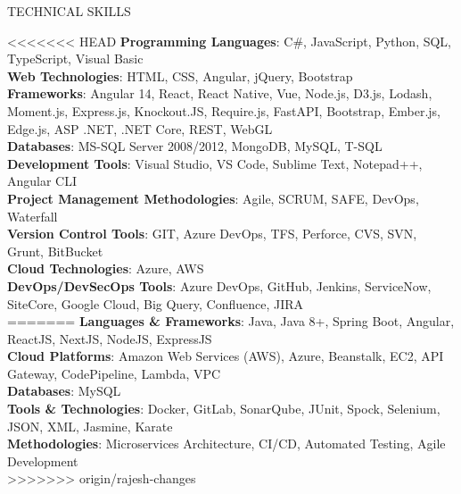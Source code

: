 \documentclass{resume} %
\begin{document}
\begin{rSection}{TECHNICAL SKILLS}
    \begin{flushleft}
<<<<<<< HEAD
                    \textbf{Programming Languages}: C\#, JavaScript, Python, SQL, TypeScript, Visual Basic \\
                    \textbf{Web Technologies}: HTML, CSS, Angular, jQuery, Bootstrap \\
                    \textbf{Frameworks}: Angular 14, React, React Native, Vue, Node.js, D3.js, Lodash, Moment.js, Express.js, Knockout.JS, Require.js, FastAPI, Bootstrap, Ember.js, Edge.js, ASP .NET, .NET Core, REST, WebGL \\
                    \textbf{Databases}: MS{-}SQL Server 2008/2012, MongoDB, MySQL, T{-}SQL \\
                    \textbf{Development Tools}: Visual Studio, VS Code, Sublime Text, Notepad++, Angular CLI \\
                    \textbf{Project Management Methodologies}: Agile, SCRUM, SAFE, DevOps, Waterfall \\
                    \textbf{Version Control Tools}: GIT, Azure DevOps, TFS, Perforce, CVS, SVN, Grunt, BitBucket \\
                    \textbf{Cloud Technologies}: Azure, AWS \\
                    \textbf{DevOps/DevSecOps Tools}: Azure DevOps, GitHub, Jenkins, ServiceNow, SiteCore, Google Cloud, Big Query, Confluence, JIRA \\
=======
                    \textbf{Languages \& Frameworks}: Java, Java 8+, Spring Boot, Angular, ReactJS, NextJS, NodeJS, ExpressJS \\
                    \textbf{Cloud Platforms}: Amazon Web Services (AWS), Azure, Beanstalk, EC2, API Gateway, CodePipeline, Lambda, VPC \\
                    \textbf{Databases}: MySQL \\
                    \textbf{Tools \& Technologies}: Docker, GitLab, SonarQube, JUnit, Spock, Selenium, JSON, XML, Jasmine, Karate \\
                    \textbf{Methodologies}: Microservices Architecture, CI/CD, Automated Testing, Agile Development \\
>>>>>>> origin/rajesh-changes
            \end{flushleft}
\end{rSection}
\end{document}
